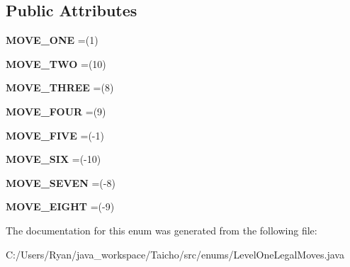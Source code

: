 \subsection*{Public Attributes}
\begin{DoxyCompactItemize}
\item 
\hypertarget{enumenums_1_1_level_one_legal_moves_a914ae60efa184134053889992913ebb0}{{\bfseries M\-O\-V\-E\-\_\-\-O\-N\-E} =(1)}\label{enumenums_1_1_level_one_legal_moves_a914ae60efa184134053889992913ebb0}

\item 
\hypertarget{enumenums_1_1_level_one_legal_moves_aa36a573614b7f7da5fd0b8a6e1ebf6e2}{{\bfseries M\-O\-V\-E\-\_\-\-T\-W\-O} =(10)}\label{enumenums_1_1_level_one_legal_moves_aa36a573614b7f7da5fd0b8a6e1ebf6e2}

\item 
\hypertarget{enumenums_1_1_level_one_legal_moves_aa4d9a4e4d6701a26e795db1b099d11a3}{{\bfseries M\-O\-V\-E\-\_\-\-T\-H\-R\-E\-E} =(8)}\label{enumenums_1_1_level_one_legal_moves_aa4d9a4e4d6701a26e795db1b099d11a3}

\item 
\hypertarget{enumenums_1_1_level_one_legal_moves_a2d2555fb3295579ea28e70de7805aee7}{{\bfseries M\-O\-V\-E\-\_\-\-F\-O\-U\-R} =(9)}\label{enumenums_1_1_level_one_legal_moves_a2d2555fb3295579ea28e70de7805aee7}

\item 
\hypertarget{enumenums_1_1_level_one_legal_moves_adecb9a998690dddda0546c1f82494875}{{\bfseries M\-O\-V\-E\-\_\-\-F\-I\-V\-E} =(-\/1)}\label{enumenums_1_1_level_one_legal_moves_adecb9a998690dddda0546c1f82494875}

\item 
\hypertarget{enumenums_1_1_level_one_legal_moves_a503a75e301cf99854f3e65c5bc8a6a79}{{\bfseries M\-O\-V\-E\-\_\-\-S\-I\-X} =(-\/10)}\label{enumenums_1_1_level_one_legal_moves_a503a75e301cf99854f3e65c5bc8a6a79}

\item 
\hypertarget{enumenums_1_1_level_one_legal_moves_ab192b113491c5ad976becf26a6f1b12a}{{\bfseries M\-O\-V\-E\-\_\-\-S\-E\-V\-E\-N} =(-\/8)}\label{enumenums_1_1_level_one_legal_moves_ab192b113491c5ad976becf26a6f1b12a}

\item 
\hypertarget{enumenums_1_1_level_one_legal_moves_ac5c7f35c6293ea7cee69be559b02039f}{{\bfseries M\-O\-V\-E\-\_\-\-E\-I\-G\-H\-T} =(-\/9)}\label{enumenums_1_1_level_one_legal_moves_ac5c7f35c6293ea7cee69be559b02039f}

\end{DoxyCompactItemize}


The documentation for this enum was generated from the following file\-:\begin{DoxyCompactItemize}
\item 
C\-:/\-Users/\-Ryan/java\-\_\-workspace/\-Taicho/src/enums/Level\-One\-Legal\-Moves.\-java\end{DoxyCompactItemize}

